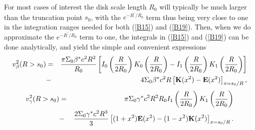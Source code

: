 \documentclass[preprint,aps]{revtex4}
\begin{document}
For most cases of interest the disk scale length $R_0$ will typically be much larger than the truncation point $s_0$, with the $e^{-R^{\prime}/R_0}$ term thus being very close to one in the integration ranges needed for both (\ref{B15}) and (\ref{B19}). Then, when we do approximate the $e^{-R^{\prime}/R_0}$ term to one, the integrals in (\ref{B15}) and (\ref{B19}) can be done analytically, and yield the simple and convenient expressions
%
\begin{eqnarray}
v^2_{\beta}(R > s_0)&=&\frac{\pi \Sigma_0 \beta^*c^2 R^2}{R_0}\left[I_0\left(\frac{R}{2R_0}
\right)K_0\left(\frac{R}{2R_0}\right)-
I_1\left(\frac{R}{2R_0}\right)
K_1\left(\frac{R}{2R_0}\right)\right]
\nonumber\\
&-&4 \Sigma_0\beta^* c^2R\left[{\bf K}(x^2)-{\bf E}(x^2)\right]_{x=s_0/R},
\label{B20}
\end{eqnarray} 
%
% 
\begin{eqnarray}
v^2_{\gamma}(R>s_0)&=& \pi \Sigma_0 \gamma^*c^2 R^2R_0I_1\left(\frac{R}{2R_0}
\right)K_1\left(\frac{R}{2R_0}\right)
\nonumber\\
&-&\frac{2 \Sigma_0\gamma^* c^2R^3}{3}
\left[(1+x^2){\bf E}(x^2)-(1-x^2){\bf K}(x^2)\right]_{x=s_0/R}.
\label{B21}
\end{eqnarray} 
% 
\end{document}
